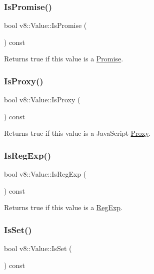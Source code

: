 \subsubsection{\texorpdfstring{Is\+Promise()}{IsPromise()}}
{\footnotesize\ttfamily bool v8\+::\+Value\+::\+Is\+Promise (\begin{DoxyParamCaption}{ }\end{DoxyParamCaption}) const}

Returns true if this value is a \mbox{\hyperlink{classv8_1_1Promise}{Promise}}. \mbox{\label{classv8_1_1Value_a3c0ad01f2ca4ac050ef8214785848918}} 
\subsubsection{\texorpdfstring{Is\+Proxy()}{IsProxy()}}
{\footnotesize\ttfamily bool v8\+::\+Value\+::\+Is\+Proxy (\begin{DoxyParamCaption}{ }\end{DoxyParamCaption}) const}

Returns true if this value is a Java\+Script \mbox{\hyperlink{classv8_1_1Proxy}{Proxy}}. \mbox{\label{classv8_1_1Value_a010aa78e7cc8e1dbb878479e534992b3}} 
\subsubsection{\texorpdfstring{Is\+Reg\+Exp()}{IsRegExp()}}
{\footnotesize\ttfamily bool v8\+::\+Value\+::\+Is\+Reg\+Exp (\begin{DoxyParamCaption}{ }\end{DoxyParamCaption}) const}

Returns true if this value is a \mbox{\hyperlink{classv8_1_1RegExp}{Reg\+Exp}}. \mbox{\label{classv8_1_1Value_a131fc14572f31efd8e2969963564abbb}} 
\subsubsection{\texorpdfstring{Is\+Set()}{IsSet()}}
{\footnotesize\ttfamily bool v8\+::\+Value\+::\+Is\+Set (\begin{DoxyParamCaption}{ }\end{DoxyParamCaption}) const}

